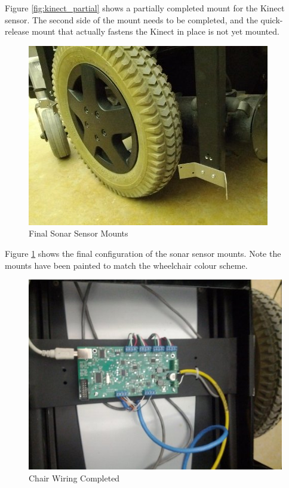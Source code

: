 \documentclass[oneside,final,a4paper]{report}
\begin{document}
Figure \ref{fig:kinect_partial} shows a partially completed mount for the Kinect sensor. The second side of the mount needs to be completed, and the quick-release mount that actually fastens the Kinect in place is not yet mounted.

\begin{figure}[hbt]
 \centering
 \includegraphics[scale=0.35]{Sensor_Mount_Final}
 \caption{Final Sonar Sensor Mounts}
 \label{fig:sonar_mount_final}
\end{figure}

Figure \ref{fig:sonar_mount_final} shows the final configuration of the sonar sensor mounts. Note the mounts have been painted to match the wheelchair colour scheme.

\begin{figure}[hbt]
 \centering
 \includegraphics[scale=0.35]{chair_wired}
 \caption{Chair Wiring Completed}
 \label{fig:chair_wired}
\end{figure}
\end{document}

